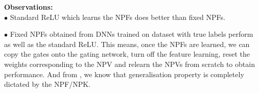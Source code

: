 \textbf{Observations:}\\
$\bullet$ Standard ReLU which learns the NPFs does better than fixed NPFs.

$\bullet$ Fixed NPFs obtained from DNNs trained on dataset with true labels perform as well as the standard ReLU. This means, once the NPFs are learned, we can copy the gates onto the gating network, turn off the feature learning, reset the weights corresponding to the NPV and relearn the NPVs from scratch to obtain performance. And from , we know that generalisation property is completely dictated by the NPF/NPK.

